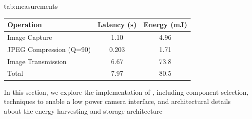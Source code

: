 \begin{definetable}{tab:measurements}
\centering
\begin{tabular}{l S[table-format=1.3] S[table-format=2.2]}
{Operation} & {Latency (s)} & {Energy (mJ)} \\
\hline
{Image Capture}           & 1.10  & 4.96\\
{JPEG Compression (Q=90)} & 0.203 & 1.71\\
{Image Transmission}      & 6.67  & 73.8\\
\hline
Total                   & 7.97 & 80.5
\end{tabular}
\caption {
    Latency and energy measurements for key operations on \namec{}, including image capture, compression, and image transmission. Measurements are averaged over 20 images. %
}
\end{definetable}

In this section, we explore the implementation of \namec{}, including component selection, techniques to enable a low power camera interface, and architectural details about the energy harvesting and storage architecture


